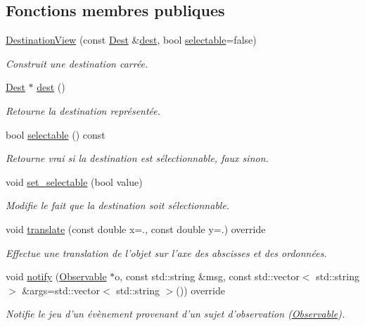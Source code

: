\subsection*{Fonctions membres publiques}
\begin{DoxyCompactItemize}
\item 
\hyperlink{classDestinationView_ade423541028697f01a4892830471881d}{Destination\+View} (const \hyperlink{classDest}{Dest} \&\hyperlink{classDestinationView_ae8afc4d5eceb09a0d8ff478b20f1fa1d}{dest}, bool \hyperlink{classDestinationView_a2193a64a9d58d0faa80fa5c0541af638}{selectable}=false)
\begin{DoxyCompactList}\small\item\em Construit une destination carrée. \end{DoxyCompactList}\item 
\hyperlink{classDest}{Dest} $\ast$ \hyperlink{classDestinationView_ae8afc4d5eceb09a0d8ff478b20f1fa1d}{dest} ()
\begin{DoxyCompactList}\small\item\em Retourne la destination représentée. \end{DoxyCompactList}\item 
bool \hyperlink{classDestinationView_a2193a64a9d58d0faa80fa5c0541af638}{selectable} () const 
\begin{DoxyCompactList}\small\item\em Retourne vrai si la destination est sélectionnable, faux sinon. \end{DoxyCompactList}\item 
void \hyperlink{classDestinationView_a8e3dd1c269161b43a4b903092550ba5d}{set\+\_\+selectable} (bool value)
\begin{DoxyCompactList}\small\item\em Modifie le fait que la destination soit sélectionnable. \end{DoxyCompactList}\item 
void \hyperlink{classDestinationView_afd76d91b06a337ff123ad34af4fb25dd}{translate} (const double x=., const double y=.) override
\begin{DoxyCompactList}\small\item\em Effectue une translation de l’objet sur l’axe des abscisses et des ordonnées. \end{DoxyCompactList}\item 
void \hyperlink{classDestinationView_ad200371afdce766b4208e45d83d1ba25}{notify} (\hyperlink{classObservable}{Observable} $\ast$o, const std\+::string \&msg, const std\+::vector$<$ std\+::string $>$ \&args=std\+::vector$<$ std\+::string $>$()) override
\begin{DoxyCompactList}\small\item\em Notifie le jeu d'un évènement provenant d'un sujet d'observation (\hyperlink{classObservable}{Observable}). \end{DoxyCompactList}\end{DoxyCompactItemize}
